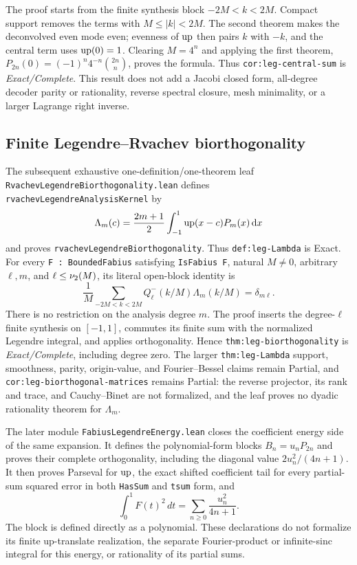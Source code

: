 \documentclass[11pt,oneside]{article}
\theoremstyle{definition}
\theoremstyle{remark}
\begin{document}
The proof starts from the finite synthesis block \(-2M<k<2M\).  Compact
support removes the terms with \(M\leq |k|<2M\).  The second theorem makes the
deconvolved even mode even; evenness of \(\operatorname{up}\) then pairs \(k\) with
\(-k\), and the central term uses \(\operatorname{up}(0)=1\).  Clearing \(M=4^n\)
and applying the first theorem,
\(P_{2n}(0)=(-1)^n4^{-n}\binom{2n}{n}\), proves the formula.  Thus
\nolinkurl{cor:leg-central-sum} is \emph{Exact/Complete}.  This result does not
add a Jacobi closed form, all-degree decoder parity or rationality, reverse
spectral closure, mesh minimality, or a larger Lagrange right inverse.

\subsection{Finite Legendre--Rvachev biorthogonality}
The subsequent exhaustive one-definition/one-theorem leaf
\nolinkurl{RvachevLegendreBiorthogonality.lean} defines
\nolinkurl{rvachevLegendreAnalysisKernel} by
\[
 \Lambda_m(c)=\frac{2m+1}{2}\int_{-1}^{1}
 \operatorname{up}(x-c)P_m(x)\mathop{}\!\mathrm{d} x
\]
and proves \nolinkurl{rvachevLegendreBiorthogonality}.  Thus
\nolinkurl{def:leg-Lambda} is Exact.  For every
\nolinkurl{F : BoundedFabius} satisfying \nolinkurl{IsFabius F}, natural
\(M\ne0\), arbitrary \(\ell,m\), and
\(\ell\leq\nu_{2}(M)\), its literal open-block identity is
\[
 \frac1M\sum_{-2M<k<2M}Q_\ell^-(k/M)\Lambda_m(k/M)=\delta_{m\ell}.
\]
There is no restriction on the analysis degree \(m\).  The proof inserts the
degree-\(\ell\) finite synthesis on \([-1,1]\), commutes its finite sum with
the normalized Legendre integral, and applies orthogonality.  Hence
\nolinkurl{thm:leg-biorthogonality} is \emph{Exact/Complete}, including
degree zero.  The larger \nolinkurl{thm:leg-Lambda} support, smoothness,
parity, origin-value, and Fourier--Bessel claims remain Partial, and
\nolinkurl{cor:leg-biorthogonal-matrices} remains Partial: the reverse
projector, its rank and trace, and Cauchy--Binet are not formalized, and the
leaf proves no dyadic rationality theorem for \(\Lambda_m\).

The later module \nolinkurl{FabiusLegendreEnergy.lean} closes the coefficient
energy side of the same expansion.  It defines the polynomial-form blocks
\(B_n=u_nP_{2n}\) and proves their complete orthogonality, including the
diagonal value \(2u_n^2/(4n+1)\).  It then proves Parseval for \(\operatorname{up}\), the
exact shifted coefficient tail for every partial-sum squared error in both
\nolinkurl{HasSum} and \nolinkurl{tsum} form, and
\[
  \int_0^1 F(t)^2\,dt
  =\sum_{n\geq0}\frac{u_n^2}{4n+1}.
\]
The block is defined directly as a polynomial.  These declarations do not
formalize its finite up-translate realization, the separate Fourier-product
or infinite-sinc integral for this energy, or rationality of its partial sums.
\end{document}
